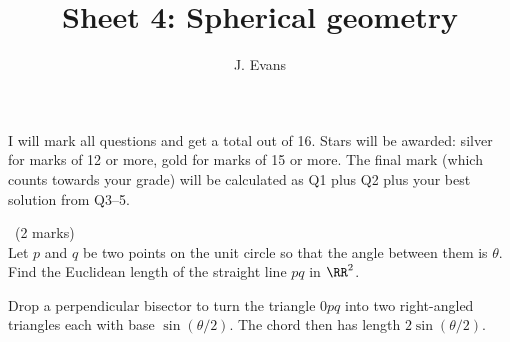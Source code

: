 \documentclass[12pt]{article}
\title{Sheet 4: Spherical geometry}
\author{J. Evans}
\date{}
\begin{document}
\maketitle

\bigskip

I will mark all questions and get a total out of 16. Stars will be awarded: silver for marks of 12 or more, gold for marks of 15 or more. The final mark (which counts towards your grade) will be calculated as Q1 plus Q2 plus your best solution from Q3--5.

\vspace{1cm}

\begin{question}\ (2 marks)\\
Let $p$ and $q$ be two points on the unit circle so that the angle between them is $\theta$. Find the Euclidean length of the straight line $pq$ in $\RR^2$.
\end{question}

\begin{answer}
  Drop a perpendicular bisector to turn the triangle $0pq$ into two right-angled triangles each with base $\sin(\theta/2)$. The chord then has length $2\sin(\theta/2)$.
\end{answer}
\newpage

\vspace{1cm}
\end{document}

